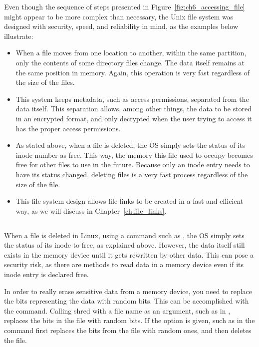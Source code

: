 Even though the sequence of steps presented in Figure~\ref{fig:ch6_accessing_file} might appear to be more complex than necessary, the Unix file system was designed with security, speed, and reliability in mind, as the examples below illustrate:
\begin{itemize}
  \item When a file moves from one location to another, within the same partition,  only the contents of some directory files change. The data itself remains at the same position in memory. Again, this operation is very fast regardless of the size of the files.
  \item This system keeps metadata, such as access permissions, separated from the data itself. This separation allows, among other things, the data to be stored in an encrypted format, and only decrypted when the user trying to access it has the proper access permissions.
  \item As stated above, when a file is deleted, the \acs{OS} simply sets the status of its inode number as free. This way, the memory this file used to occupy becomes free for other files to use in the future. Because only an inode entry needs to have its status changed, deleting files is a very fast process regardless of the size of the file.
  \item This file system design allows file links to be created in a fast and efficient way, as we will discuss in Chapter~\ref{ch:file_links}.
\end{itemize}

\subsection{}
When a file is deleted in Linux, using a command such as , the \acs{OS} simply sets the status of its inode to free, as explained above. However, the data itself still exists in the memory device until it gets rewritten by other data. This can pose a security risk, as there are methods to read data in a memory device even if its inode entry is declared free.

In order to really erase sensitive data from a memory device, you need to replace the bits representing the data with random bits. This can be accomplished with the  command. Calling shred with a file name as an argument, such as in , replaces the bits in the  file with random bits. If the option  is given, such as in  the  command first replaces the bits from the  file with random ones, and then deletes the file.

